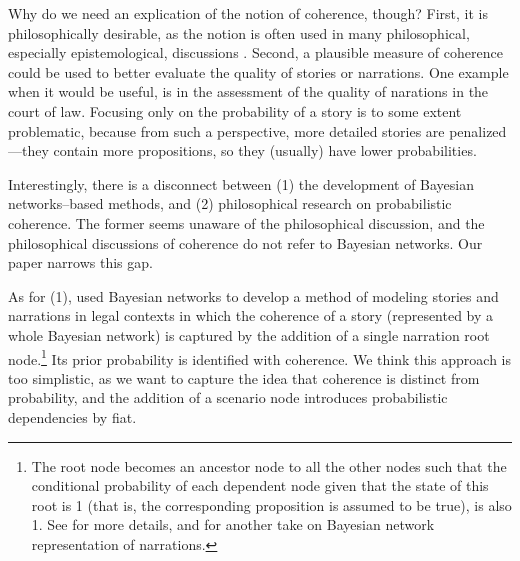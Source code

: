 \documentclass[10pt,]{scrartcl}
\begin{document}
Why do we need an explication of the notion of coherence, though? 
First, it is philosophically desirable, as  the notion is often used in many philosophical, especially
epistemological, discussions \citep[for instance, in discussions about the truth-conduciveness of coherence,][]{shogenji1999conducive,olsson2001conducive}.  Second, a  plausible measure of coherence could be used to better evaluate the quality of  stories or narrations. One example  when it would be useful, is in the assessment of the quality of  narations in the court of law. Focusing only on the probability of a story is to some extent problematic, because from such a perspective, more detailed stories are penalized---they contain more propositions, so they (usually) have lower probabilities.  






Interestingly, there is a disconnect between (1) the development of  Bayesian networks--based methods, and (2) philosophical research on probabilistic coherence. The former seems  unaware of the philosophical discussion, and the philosophical discussions of coherence do not refer to  Bayesian networks. Our paper  narrows this gap.


As for (1), \citet{vlek2013modeling} used Bayesian networks to develop a method of   modeling stories and narrations in legal contexts in which the coherence of a story (represented by a whole Bayesian network)
is captured by the addition of a single narration root node.\footnote{The root node  becomes an ancestor
node to all the other nodes such that the conditional probability of
each dependent node given that the state of this root is 1 (that is, the
corresponding proposition is assumed to be true), is also 1. See \citep{vlek2014building,vlek2015,vlek2016method,vlek2016stories} for more details, and \citep{fenton2013general} for another take on Bayesian network representation of narrations.}  Its prior probability is identified with coherence. We think this approach is too simplistic, as we want to capture the idea that coherence is distinct
from probability, and  the addition of a scenario node  introduces probabilistic
dependencies by fiat. 










\end{document}
